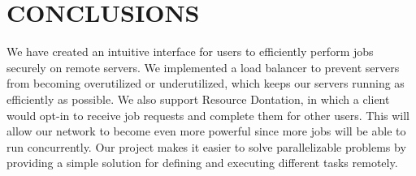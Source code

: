 \section{CONCLUSIONS}\label{sec:conclusions}

We have created an intuitive interface for users to efficiently perform jobs securely on remote servers. We implemented a load balancer to prevent servers from becoming overutilized or underutilized, which keeps our servers running as efficiently as possible. We also support Resource Dontation, in which a client would opt-in to receive job requests and complete them for other users. This will allow our network to become even more powerful since more jobs will be able to run concurrently. Our project makes it easier to solve parallelizable problems by providing a simple solution for defining and executing different tasks remotely.